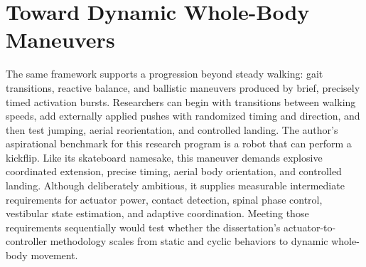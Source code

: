 \section{Toward Dynamic Whole-Body Maneuvers}\label{sec:fw_kickflip}

The same framework supports a progression beyond steady walking: gait transitions, reactive balance, and ballistic maneuvers produced by brief, precisely timed activation bursts. Researchers can begin with transitions between walking speeds, add externally applied pushes with randomized timing and direction, and then test jumping, aerial reorientation, and controlled landing. The author's aspirational benchmark for this research program is a robot that can perform a kickflip. Like its skateboard namesake, this maneuver demands explosive coordinated extension, precise timing, aerial body orientation, and controlled landing. Although deliberately ambitious, it supplies measurable intermediate requirements for actuator power, contact detection, spinal phase control, vestibular state estimation, and adaptive coordination. Meeting those requirements sequentially would test whether the dissertation's actuator-to-controller methodology scales from static and cyclic behaviors to dynamic whole-body movement.
